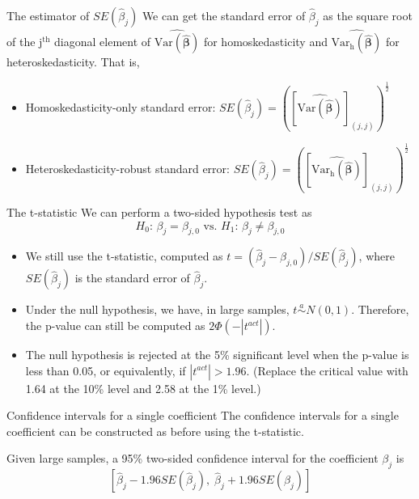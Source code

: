 \documentclass[presentation,10pt]{beamer}
\newcommand{\var}{\mathrm{Var}}
\begin{document}
\begin{frame}[label={sec:org8ef0d08}]{The estimator of \(SE(\hat{\beta}_j)\)}
We can get the standard error of \(\hat{\beta}_j\) as the
square root of the j\(^{\text{th}}\) diagonal element of
\(\widehat{\var(\hat{\boldsymbol{\beta}})}\) for homoskedasticity and
\(\widehat{\var_{\mathrm{h}}(\hat{\boldsymbol{\beta}})}\) for
heteroskedasticity. That is,
\begin{itemize}
\item Homoskedasticity-only standard error: \(SE(\hat{\beta}_j) =
  \left(\left[\widehat{\var(\hat{\boldsymbol{\beta}})}\right]_{(j,j)}\right)^{\frac{1}{2}}\)
\item Heteroskedasticity-robust standard error: \(SE(\hat{\beta}_j) =
  \left(\left[\widehat{\var_{\mathrm{h}}(\hat{\boldsymbol{\beta}})}\right]_{(j,j)}\right)^{\frac{1}{2}}\)
\end{itemize}
\end{frame}

\begin{frame}[label={sec:org28c07d4}]{The t-statistic}
We can perform a two-sided hypothesis test as
\[ H_0:\, \beta_j = \beta_{j,0} \text{ vs. } H_1:\, \beta_j \neq
\beta_{j,0} \]

\begin{itemize}
\item We still use the t-statistic, computed as
\(t = (\hat{\beta}_j - \beta_{j,0})/SE(\hat{\beta}_j)\),
where \(SE(\hat{\beta}_j)\) is the standard error of \(\hat{\beta}_j\).

\item Under the null hypothesis, we have, in large samples, \(t \overset{a}{\sim} N(0, 1)\).
Therefore, the p-value can still be computed as \(2\varPhi(-|t^{act}|)\).

\item The null hypothesis is rejected at the 5\% significant level when
the p-value is less than 0.05, or equivalently, if \(|t^{act}| >
  1.96\). (Replace the critical value with 1.64 at the 10\% level and 2.58
at the 1\% level.)
\end{itemize}
\end{frame}

\begin{frame}[label={sec:org7bc0d1f}]{Confidence intervals for a single coefficient}
The confidence intervals for a single coefficient can be constructed
as before using the t-statistic.

\vspace{0.2cm}

Given large samples, a 95\% two-sided confidence interval for the
coefficient \(\beta_j\) is
\[ \left[\hat{\beta}_j - 1.96 SE(\hat{\beta}_j),\; \hat{\beta}_j +
1.96 SE(\hat{\beta}_j)\right] \]
\end{frame}
\end{document}
